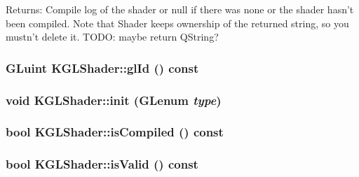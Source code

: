 \begin{Desc}
\item[Returns:]Compile log of the shader or null if there was none or the shader hasn't been compiled. Note that Shader keeps ownership of the returned string, so you mustn't delete it. TODO: maybe return QString? \end{Desc}
\hypertarget{class_k_g_l_shader_4a54ab05e1fa2255370fe0145548f0ac}{
\subsubsection[{glId}]{\setlength{\rightskip}{0pt plus 5cm}GLuint KGLShader::glId () const}}
\label{class_k_g_l_shader_4a54ab05e1fa2255370fe0145548f0ac}


\hypertarget{class_k_g_l_shader_2c30a1d2be6fb5f4bcae597943cd71d2}{
\subsubsection[{init}]{\setlength{\rightskip}{0pt plus 5cm}void KGLShader::init (GLenum {\em type})}}
\label{class_k_g_l_shader_2c30a1d2be6fb5f4bcae597943cd71d2}


\hypertarget{class_k_g_l_shader_490ad591f21b032aa59ab5c12813f7e8}{
\subsubsection[{isCompiled}]{\setlength{\rightskip}{0pt plus 5cm}bool KGLShader::isCompiled () const}}
\label{class_k_g_l_shader_490ad591f21b032aa59ab5c12813f7e8}


\hypertarget{class_k_g_l_shader_62c2bb3789a5baaa28cd68167e973728}{
\subsubsection[{isValid}]{\setlength{\rightskip}{0pt plus 5cm}bool KGLShader::isValid () const}}
\label{class_k_g_l_shader_62c2bb3789a5baaa28cd68167e973728}


